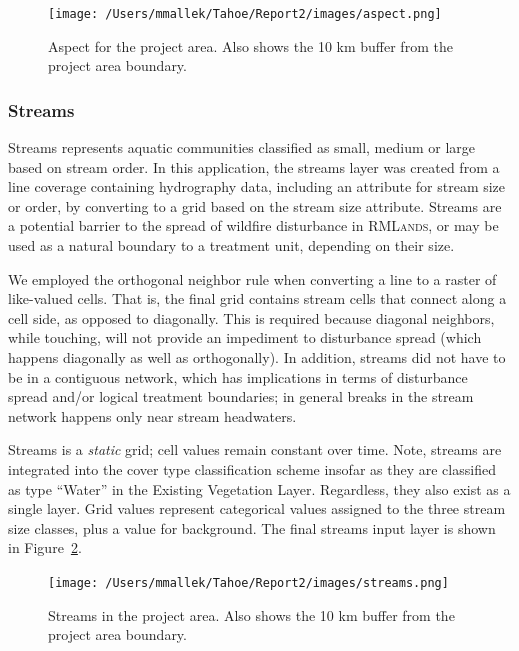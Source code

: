 \begin{figure}[htbp]
\centering
\texttt{[image: /Users/mmallek/Tahoe/Report2/images/aspect.png]}
\caption{Aspect for the project area. Also shows the 10 km buffer from the project area boundary.} 
\label{aspectmap}
\end{figure}

\subsubsection{Streams} 
Streams represents aquatic communities classified as small, medium or large based on stream order. In this application, the streams layer was created from a line coverage containing hydrography data, including an attribute for stream size or order, by converting to a grid based on the stream size attribute. Streams are a potential barrier to the spread of wildfire disturbance in \textsc{RMLands}, or may be used as a natural boundary to a treatment unit, depending on their size.

We employed the orthogonal neighbor rule when converting a line to a raster of like-valued cells. That is, the final grid contains stream cells that connect along a cell side, as opposed to diagonally. This is required because diagonal neighbors, while touching, will not provide an impediment to disturbance spread (which happens diagonally as well as orthogonally). In addition, streams did not have to be in a contiguous network, which has implications in terms of disturbance spread and/or logical treatment boundaries; in general breaks in the stream network happens only near stream headwaters. 

Streams is a \emph{static} grid; cell values remain constant over time. Note, streams are integrated into the cover type classification scheme insofar as they are classified as type ``Water'' in the Existing Vegetation Layer. Regardless, they also exist as a single layer. Grid values represent categorical values assigned to the three stream size classes, plus a value for background. The final streams input layer is shown in Figure~\ref{streamsmap}.

\begin{figure}[htbp]
\centering
\texttt{[image: /Users/mmallek/Tahoe/Report2/images/streams.png]}
\caption{Streams in the project area. Also shows the 10 km buffer from the project area boundary.} 
\label{streamsmap}
\end{figure}

